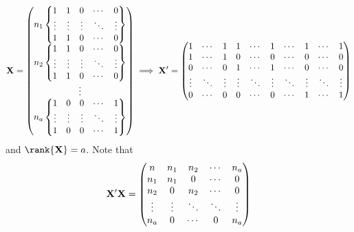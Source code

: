 \[ \mathbf{X}=\begin{pmatrix}
        n_1\begin{Bmatrix}
               1      & 1      & 0      & \cdots & 0      \\
               \vdots & \vdots & \vdots & \ddots & \vdots \\
               1      & 1      & 0      & \cdots & 0      \\
           \end{Bmatrix} \\
        n_2\begin{Bmatrix}
               1      & 1      & 0      & \cdots & 0      \\
               \vdots & \vdots & \vdots & \ddots & \vdots \\
               1      & 1      & 0      & \cdots & 0      \\
           \end{Bmatrix} \\
        \vdots                                        \\
        n_a\begin{Bmatrix}
               1      & 0      & 0      & \cdots & 1      \\
               \vdots & \vdots & \vdots & \ddots & \vdots \\
               1      & 0      & 0      & \cdots & 1      \\
           \end{Bmatrix}
    \end{pmatrix}\implies
    \mathbf{X}'=\begin{pmatrix}
        1      & \cdots & 1      & 1      & \cdots & 1      & \cdots & 1      & \cdots & 1      \\
        1      & \cdots & 1      & 0      & \cdots & 0      & \cdots & 0      & \cdots & 0      \\
        0      & \cdots & 0      & 1      & \cdots & 1      & \cdots & 0      & \cdots & 0      \\
        \vdots & \ddots & \vdots & \vdots & \ddots & \vdots & \ddots & \vdots & \ddots & \vdots \\
        0      & \cdots & 0      & 0      & \cdots & 0      & \cdots & 1      & \cdots & 1
    \end{pmatrix} \]
and $ \rank{\Matrix{X}}=a $. Note that
\[ \mathbf{X}'\mathbf{X}=\begin{pmatrix}
        n      & n_1    & n_2    & \cdots & n_a    \\
        n_1    & n_1    & 0      & \cdots & 0      \\
        n_2    & 0      & n_2    & \cdots & 0      \\
        \vdots & \vdots & \ddots & \ddots & \vdots \\
        n_a    & 0      & \cdots & 0      & n_a
    \end{pmatrix} \]
